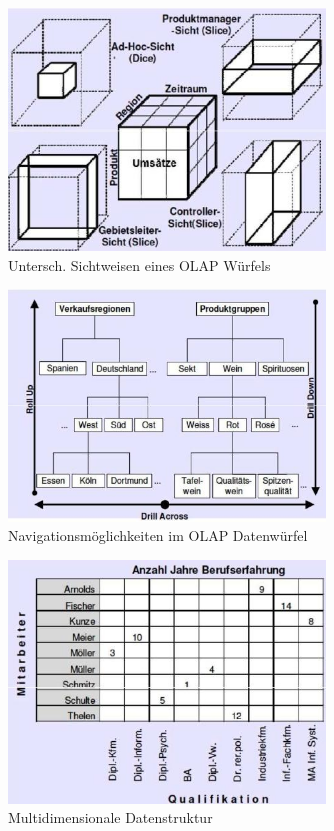 \documentclass[ngerman,a4paper,12pt]{scrreprt}
\begin{document}
\begin{figure}[H]
	\centering
	\includegraphics[width=0.75\textwidth]{img/V6.11.jpg}
	\caption{Untersch. Sichtweisen eines OLAP Würfels}
	\label{}
\end{figure}				

\begin{figure}[H]
	\centering
	\includegraphics[width=0.75\textwidth]{img/V7.1.jpg}
	\caption{Navigationsmöglichkeiten im OLAP Datenwürfel}
	\label{}
\end{figure}

\begin{figure}[H]
	\centering
	\includegraphics[width=0.75\textwidth]{img/V7.2.jpg}
	\caption{Multidimensionale Datenstruktur}
	\label{}
\end{figure}	
\end{document}

